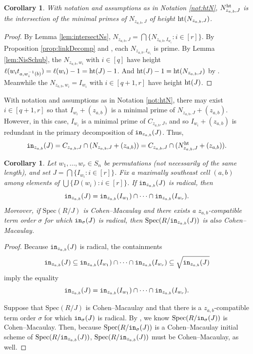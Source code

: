 \documentclass[12pt,reqno]{amsart}
\newtheorem{corollary}[theorem]{Corollary}
\newtheorem{Main Conjecture}[theorem]{Main Conjecture}
\theoremstyle{remark}
\theoremstyle{plain}
\newcommand{\init}{{\tt in}}
\newcommand{\hgt}{{\rm{ht }}}
\newcommand{\spec}{{\mbox{Spec}}}
\begin{document}
\begin{corollary}\label{cor:htNrightht}
 With notation and assumptions as in Notation \ref{not:htN}, $N_{z_{a,b},J}^{\rm ht}$ is the intersection of the minimal primes of $N_{z_{a,b},J}$ of height $\hgt (N_{z_{a,b},J})$. 
\end{corollary}
\begin{proof}
By Lemma \ref{lem:intersectNs}, $N_{z_{a,b},J} = \bigcap\{ N_{z_{a,b},I_{w_i}}:{i \in [r]}\}$.  By Proposition \ref{prop:linkDecomp} and \cite[Proposition 3.3]{Ful92}, each $N_{z_{a,b},I_{w_i}}$ is prime.  By Lemma \ref{lem:NisSchub}, the $N_{z_{a,b},w_i}$ with $i \in [q]$ have height $\ell(w_it_{a,w_i^{-1}(b)}) = \ell(w_i)-1=\hgt (J)-1$.  And $\hgt (J)-1= \hgt (N_{z_{a,b},J})$ by \cite[Lemma 2.8]{KR}. Meanwhile the $N_{z_{a,b},w_i} = I_{w_i}$ with $i \in [q+1,r]$ have height $\hgt (J)$. 
\end{proof}

With notation and assumptions as in Notation \ref{not:htN}, there may exist $i \in [q+1,r]$ so that $I_{w_i}+(z_{a,b})$ is a minimal prime of $N_{z_{a,b},J}+(z_{a,b})$.  However, in this case, $I_{w_i}$ is a minimal prime of $C_{z_{a,b},J}$, and so $I_{w_i}+(z_{a,b})$ is redundant in the primary decomposition of $\init_{z_{a,b}}(J)$.  Thus, 
\[\init_{z_{a,b}}(J) = C_{z_{a,b},J} \cap (N_{z_{a,b},J}+(z_{a,b})) = C_{z_{a,b},J} \cap (N_{z_{a,b},J}^{\rm ht}+(z_{a,b})).\]



\begin{corollary}\label{cor:CM}
Let $w_1, \ldots, w_r \in S_n$ be permutations (not necessarily of the same length), and set $J= \bigcap \{I_{w_i}:i\in[r]\}$.
Fix a maximally southeast cell $(a,b)$ among elements of $\bigcup \{D(w_i):i\in[r]\}$.
If $\init_{z_{a,b}} (J)$ is radical, then \[
\init_{z_{a,b}} (J) = \init_{z_{a,b}}(I_{w_1}) \cap \cdots \cap \init_{z_{a,b}}(I_{w_r}).
\]  Moreover, if $\spec(R/J)$ is Cohen--Macaulay and there exists a $z_{a,b}$-compatible term order $\sigma$ for which $\init_\sigma(J)$ is radical, then $\spec(R/\init_{z_{a,b}}(J))$ is also Cohen--Macaulay.
\end{corollary}
\begin{proof}
Because $\init_{z_{a,b}}(J)$ is radical, the containments \[
\init_{z_{a,b}}(J) \subseteq \init_{z_{a,b}}(I_{w_1}) \cap \cdots \cap \init_{z_{a,b}}(I_{w_r}) \subseteq \sqrt{\init_{z_{a,b}}(J)}
\] imply the equality \[
\init_{z_{a,b}}(J) = \init_{z_{a,b}}(I_{w_1}) \cap \cdots \cap \init_{z_{a,b}}(I_{w_r}).
\]  

Suppose that $\spec(R/J)$ is Cohen--Macaulay and that there is a $z_{a,b}$-compatible term order $\sigma$ for which $\init_\sigma(J)$ is radical.  By \cite[Corollary 2.11(iii)]{CV20}, we know $\spec(R/\init_\sigma(J))$ is Cohen--Macaulay.  Then, because $\spec(R/\init_\sigma(J))$ is a Cohen--Macaulay initial scheme of $\spec(R/\init_{z_{a,b}}(J))$, $\spec(R/\init_{z_{a,b}}(J))$ must be Cohen--Macaulay, as well.  
\end{proof}
\end{document}

